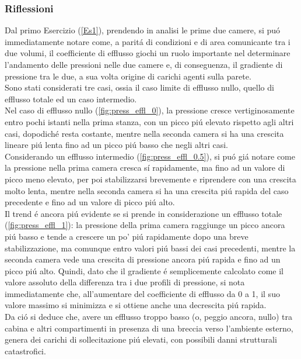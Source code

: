 \documentclass{article}
\begin{document}
        \subsubsection{Riflessioni}
        Dal primo Esercizio (\ref{Es1}), prendendo in analisi le prime due camere, si puó immediatamente notare come,
        a paritá di condizioni e di area comunicante tra i due volumi,
        il coefficiente di efflusso giochi un ruolo importante nel determinare l'andamento
        delle pressioni nelle due camere e, di conseguenza, il gradiente di pressione tra le due,
        a sua volta origine di carichi agenti sulla parete.\\ 
        Sono stati considerati tre casi, ossia il caso limite di efflusso nullo, quello di efflusso totale
        ed un caso intermedio.\\ 
        Nel caso di efflusso nullo (\ref{fig:press_effl_0}), la pressione cresce
        vertiginosamente entro pochi istanti nella prima stanza, con un picco piú elevato 
        rispetto agli altri casi, dopodiché resta costante, mentre nella seconda camera
        si ha una crescita lineare piú lenta fino ad un picco piú basso che negli altri casi.\\ 
        Considerando un efflusso intermedio (\ref{fig:press_effl_0.5}), si puó giá 
        notare come la pressione nella prima camera cresca sí rapidamente, ma 
        fino ad un valore di picco meno elevato, per poi stabilizzarsi brevemente e riprendere con una crescita molto lenta, 
        mentre nella seconda camera si ha una crescita piú rapida del caso precedente e fino ad un valore di picco piú alto.
        \\ 
        Il trend é ancora piú evidente se si prende in considerazione un efflusso 
        totale (\ref{fig:press_effl_1}): la pressione della prima camera
        raggiunge un picco ancora piú basso e tende a crescere un po' piú rapidamente
        dopo una breve stabilizzazione, ma comunque entro valori piú bassi dei casi precedenti, mentre 
        la seconda camera vede una crescita di pressione ancora piú rapida
        e fino ad un picco piú alto.\linebreak
        \linebreak
        Quindi, dato che il gradiente é semplicemente calcolato come il valore assoluto
        della differenza tra i due profili di pressione, si nota immediatamente che, 
        all'aumentare del coefficiente di efflusso da 0 a 1, il suo valore
        massimo si minimizza e si ottiene anche una decrescita piú rapida.\\ 
        Da ció si deduce che, avere un efflusso troppo basso (o, peggio ancora, nullo)
        tra cabina e altri compartimenti in presenza di una breccia verso l'ambiente esterno, genera dei carichi di sollecitazione
        piú elevati, con possibili danni strutturali catastrofici.
\end{document}
